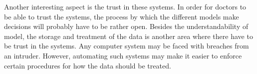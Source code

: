 Another interesting aspect is the trust in these systems.
In order for doctors to be able to trust the systems, the process by which the different models make decisions will probably have to be rather open.
Besides the understandability of model, the storage and treatment of the data is another area where there have to be trust in the systems.
Any computer system may be faced with breaches from an intruder.
However, automating such systems may make it easier to enforce certain procedures for how the data should be treated.